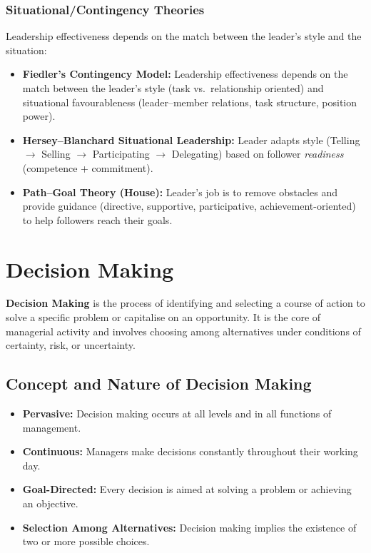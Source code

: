 \documentclass[12pt,a4paper]{article}
\begin{document}
\subsubsection{Situational/Contingency Theories}
Leadership effectiveness depends on the match between the leader's style and the situation:
\begin{itemize}[leftmargin=*, itemsep=2pt]
  \item \textbf{Fiedler's Contingency Model:} Leadership effectiveness depends on the match between the leader's style (task vs.\ relationship oriented) and situational favourableness (leader--member relations, task structure, position power).
  \item \textbf{Hersey--Blanchard Situational Leadership:} Leader adapts style (Telling $\to$ Selling $\to$ Participating $\to$ Delegating) based on follower \textit{readiness} (competence + commitment).
  \item \textbf{Path--Goal Theory (House):} Leader's job is to remove obstacles and provide guidance (directive, supportive, participative, achievement-oriented) to help followers reach their goals.
\end{itemize}

\section{Decision Making}

\begin{tcolorbox}[defbox, title={\textbf{Decision Making --- Definition}}]
\textbf{Decision Making} is the process of identifying and selecting a course of action to solve a specific problem or capitalise on an opportunity. It is the core of managerial activity and involves choosing among alternatives under conditions of certainty, risk, or uncertainty.
\end{tcolorbox}

\subsection{Concept and Nature of Decision Making}
\begin{itemize}[leftmargin=*, itemsep=3pt]
  \item \textbf{Pervasive:} Decision making occurs at all levels and in all functions of management.
  \item \textbf{Continuous:} Managers make decisions constantly throughout their working day.
  \item \textbf{Goal-Directed:} Every decision is aimed at solving a problem or achieving an objective.
  \item \textbf{Selection Among Alternatives:} Decision making implies the existence of two or more possible choices.
\end{itemize}
\end{document}
